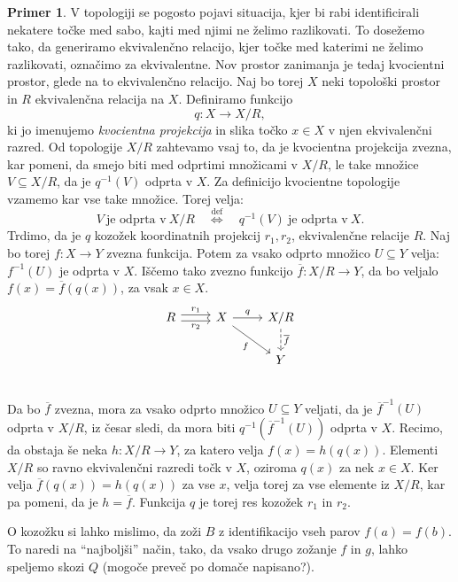 \documentclass[12pt,a4paper]{book}
\theoremstyle{definition}
\theoremstyle{plain}
\theoremstyle{definition}
\newtheorem{primer}{Primer}[section]
\theoremstyle{remark}
\begin{document}
\begin{primer}
V topologiji se pogosto pojavi situacija, kjer bi rabi identificirali nekatere točke med sabo, kajti med njimi ne želimo razlikovati. To dosežemo tako, da generiramo ekvivalenčno relacijo, kjer točke med katerimi ne želimo razlikovati, označimo za ekvivalentne. Nov prostor zanimanja je tedaj kvocientni prostor, glede na to ekvivalenčno relacijo.  Naj bo torej $X$ neki topološki prostor in $R$ ekvivalenčna relacija na $X$. Definiramo funkcijo
$$ q : X \to X/R,$$
ki jo imenujemo \emph{kvocientna projekcija} in slika točko $x \in X$ v njen ekvivalenčni razred. Od topologije $X/R$ zahtevamo vsaj to, da je kvocientna projekcija zvezna, kar pomeni, da smejo biti med odprtimi množicami v $X/R$, le take množice $V \subseteq X/R$, da je $q^{-1}(V)$ odprta v $X$. Za definicijo kvocientne topologije vzamemo kar vse take množice. Torej velja:
$$V \ \text{je odprta v} \ X/R \quad \overset{\text{def}}{\Leftrightarrow} \quad q^{-1}(V) \ \text{je odprta v} \ X.$$
Trdimo, da je $q$ kozožek koordinatnih projekcij $r_1,r_2$, ekvivalenčne relacije $R$.
Naj bo torej $f : X \to Y$ zvezna funkcija. Potem za vsako odprto množico $U \subseteq Y$ velja: $f^{-1}(U)$ je odprta v $X$. Iščemo tako zvezno funkcijo $\overline{f} : X/R \to Y$, da bo veljalo $f(x) = \overline{f}(q(x))$, za vsak $x \in X$.
$$\begin{tikzcd}
R \ar[r, shift left, "r_1"] \ar[r, shift right, "r_2"'] & X \ar[r, "q"] \ar[dr, "f"'] & X/R \ar[d, dashed, "\overline{f}"] \\
& & Y \\
\end{tikzcd}$$
Da bo $\overline{f}$ zvezna, mora za vsako odprto množico $U \subseteq Y$ veljati, da je $\overline{f}^{-1}(U)$ odprta v $X/R$, iz česar sledi, da mora biti $q^{-1}(\overline{f}^{-1}(U))$ odprta v $X$. Recimo, da obstaja še neka $h : X/R \to Y$, za katero velja $f(x) = h(q(x))$. Elementi $X/R$ so ravno ekvivalenčni razredi točk v $X$, oziroma $q(x)$ za nek $x \in X$. Ker velja $\overline{f}(q(x)) = h(q(x))$ za vse $x$, velja torej za vse elemente iz $X/R$, kar pa pomeni, da je $h = \overline{f}$. Funkcija $q$ je torej res kozožek $r_1$ in $r_2$.

\end{primer}

O kozožku si lahko mislimo, da zoži $B$ z identifikacijo vseh parov $f(a) = f(b)$. To naredi na "`najboljši"' način, tako, da vsako drugo zožanje $f$ in $g$, lahko speljemo skozi $Q$ (mogoče preveč po domače napisano?).
\end{document}
